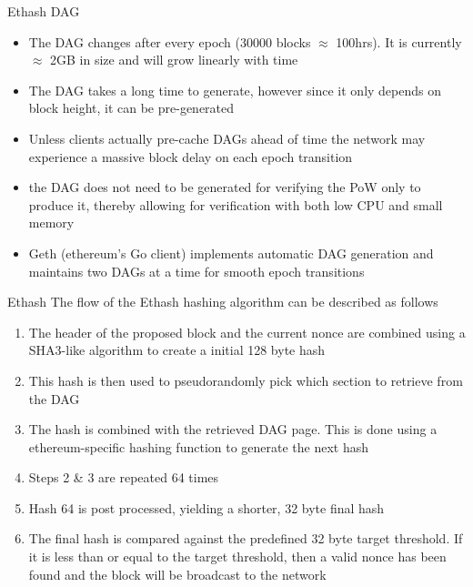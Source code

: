 \documentclass[9pt]{beamer}
\begin{document}
\begin{frame}{Ethash DAG}
	\begin{itemize}
		\item The DAG changes after every epoch (30000 blocks $\approx$ 100hrs). It is currently $\approx$ 2GB in size and will grow linearly with time
		\item The DAG takes a long time to generate, however since it only depends on block height, it can be pre-generated
		\item Unless clients actually pre-cache DAGs ahead of time the network may experience a massive block delay on each epoch transition
		\item the DAG does not need to be generated for verifying the PoW only to produce it, thereby allowing for verification with both low CPU and small memory
		\item Geth (ethereum's Go client) implements automatic DAG generation and maintains two DAGs at a time for smooth epoch transitions
	\end{itemize}
\end{frame}


\begin{frame}{Ethash}
	The flow of the Ethash hashing algorithm can be described as follows
	\begin{enumerate}
		\item The header of the proposed block and the current nonce  are combined using a SHA3-like algorithm to create a initial 128 byte hash
		\item This hash is then used to pseudorandomly pick which section to retrieve from the DAG
		\item The hash is combined with the retrieved DAG page. This is done using a ethereum-specific hashing function to generate the next hash
		\item Steps 2 \& 3 are repeated 64 times
		\item Hash 64 is post processed, yielding a shorter, 32 byte final hash
		\item The final hash is compared against the predefined 32 byte target threshold. If it is less than or equal to the target threshold, then a valid nonce has been found and the block will be broadcast to the network
	\end{enumerate}
\end{frame}

\end{document}
